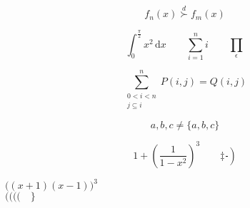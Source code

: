 \documentclass[a4paper,11pt]{report}
\begin{document}
\begin{equation*}
  f_n(x) \stackrel{d}{\succ} f_m(x)
\end{equation*}

\begin{equation*}
  \int_0^{\frac{\pi}{2}} x^2 \, \mathrm{d}x \qquad
  \sum_{i=1}^n i \qquad
  \prod_\epsilon
\end{equation*}

\begin{equation*}
  \sum^n_{\substack{0<i<n \\
                  j\subseteq i}}
  P(i,j) = Q(i,j)
\end{equation*}

\begin{equation*}
  {a,b,c} \neq \{a,b,c\}
\end{equation*}

\begin{equation*}
  1 + \left(\frac{1}{1-x^2}\right)^3 \qquad
  \left. \ddagger \frac{~}{~} \right)
\end{equation*}

$\Big((x+1)(x-1)\Big)^3$ \\
$\big(\Big(\bigg(\Bigg( \quad
 \big\}$
\end{document}

